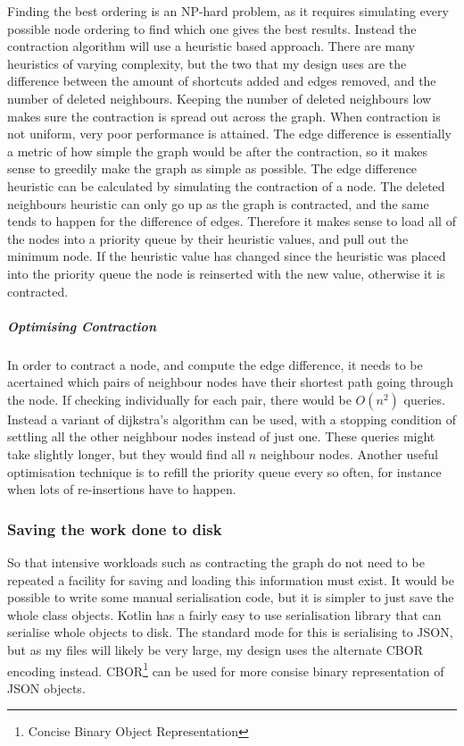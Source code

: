 \documentclass[11pt,twoside,a4paper]{article}
\begin{document}
Finding the best ordering is an NP-hard problem, as it requires simulating every possible node ordering to find which one gives the best results. Instead the contraction algorithm will use a heuristic based approach. There are many heuristics of varying complexity, but the 
two that my design uses are the difference between the amount of shortcuts added and edges removed, and the number of deleted neighbours. Keeping the number of deleted neighbours low makes sure the contraction is spread out across the graph. When contraction is not uniform, very poor performance is attained.
The edge difference is essentially a metric of how simple the graph would be after the contraction, so it makes sense to greedily make the graph as simple as possible. The edge difference heuristic can be calculated by simulating the contraction of a node.
The deleted neighbours heuristic can only go up as the graph is contracted, and the same tends to happen for the difference of edges. Therefore it makes sense to load all of the nodes into a priority queue by their heuristic values,
and pull out the minimum node. If the heuristic value has changed since the heuristic was placed into the priority queue the node is reinserted with the new value, otherwise it is contracted.    
\subparagraph{Optimising Contraction}
In order to contract a node, and compute the edge difference, it needs to be acertained which pairs of neighbour nodes have their shortest path going through the node. If checking individually for each pair, there would be $O(n^2)$ queries.
Instead a variant of dijkstra's algorithm can be used, with a stopping condition of settling all the other neighbour nodes instead of just one. These queries might take slightly longer, but they would find all $n$ neighbour nodes.
Another useful optimisation technique is to refill the priority queue every so often, for instance when lots of re-insertions have to happen. 
\subsubsection{Saving the work done to disk}
\label{sec:serialization}
So that intensive workloads such as contracting the graph do not need to be repeated a facility for saving and loading this information must exist.
It would be possible to write some manual serialisation code, but it is simpler to just save the whole class objects. Kotlin has a 
fairly easy to use serialisation library that can serialise whole objects to disk\cite{kotlinh}. The standard mode for this is serialising to JSON, but as my files will likely be very large, my design uses the alternate CBOR encoding instead.
CBOR\footnote{Concise Binary Object Representation} can be used for more consise binary representation of JSON objects.
\end{document}
